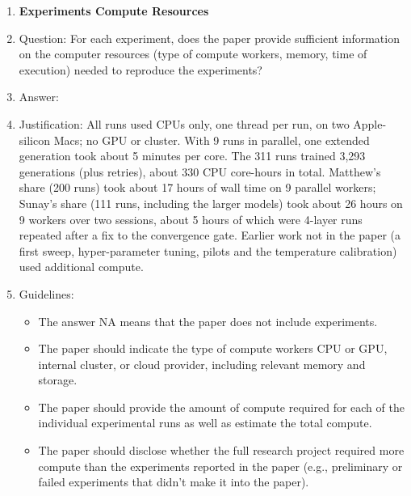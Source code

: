 \begin{enumerate}
\item {\bf Experiments Compute Resources}
    \item[] Question: For each experiment, does the paper provide sufficient information on the computer resources (type of compute workers, memory, time of execution) needed to reproduce the experiments?
    \item[] Answer: \answerYes{}
    \item[] Justification: All runs used CPUs only, one thread per run, on two Apple-silicon Macs; no GPU or cluster. With 9 runs in parallel, one extended generation took about 5 minutes per core. The 311 runs trained 3,293 generations (plus retries), about 330 CPU core-hours in total. Matthew's share (200 runs) took about 17 hours of wall time on 9 parallel workers; Sunay's share (111 runs, including the larger models) took about 26 hours on 9 workers over two sessions, about 5 hours of which were 4-layer runs repeated after a fix to the convergence gate. Earlier work not in the paper (a first sweep, hyper-parameter tuning, pilots and the temperature calibration) used additional compute.
    \item[] Guidelines:
    \begin{itemize}
        \item The answer NA means that the paper does not include experiments.
        \item The paper should indicate the type of compute workers CPU or GPU, internal cluster, or cloud provider, including relevant memory and storage.
        \item The paper should provide the amount of compute required for each of the individual experimental runs as well as estimate the total compute.
        \item The paper should disclose whether the full research project required more compute than the experiments reported in the paper (e.g., preliminary or failed experiments that didn't make it into the paper).
    \end{itemize}


\end{enumerate}
